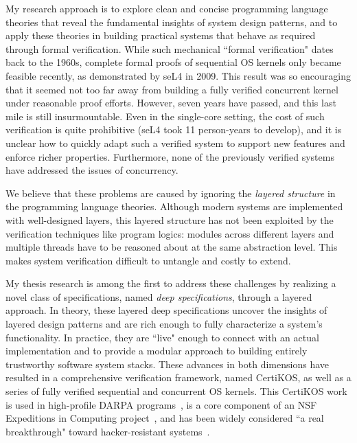 \documentclass[a4paper, 10pt]{article}
\begin{document}
\begin{small}
My research approach  is to explore clean and concise
programming language theories that 
reveal the fundamental insights of system design patterns,
and to apply these theories
in building practical systems that behave as required
through formal verification. 
While such mechanical ``formal verification" dates back to the 1960s, 
complete formal proofs of sequential OS kernels only became feasible recently, as demonstrated by seL4 in 2009. This result was so encouraging that it seemed not too far away from building a fully verified concurrent kernel under reasonable proof efforts. However, 
seven years have passed, and
this last mile is still insurmountable.
Even in the single-core setting, the cost of such verification is quite prohibitive
(seL4 took 11 person-years to develop), and
 it is unclear how to quickly adapt such a verified system to support new features and enforce richer properties. 
Furthermore, none of the previously verified systems have addressed the
issues of concurrency.

 
We believe that these problems
are caused by ignoring the \emph{layered structure} in the programming language theories.
Although modern systems are implemented with
well-designed layers, this layered structure has not been exploited by the verification techniques like program logics:  modules across different layers and multiple threads have to be reasoned about at 
the same abstraction level. This makes system verification
difficult to untangle
and costly to extend.

My thesis research is among the first to address these challenges
by realizing a novel class of specifications, named \emph{deep specifications}, through a layered approach.
In theory, these layered deep specifications uncover the 
insights of  layered design patterns
and are rich
enough to fully characterize a system's functionality. In practice, they are ``live" enough to  connect   with an actual  implementation and to provide a modular approach to building
entirely trustworthy
 software system stacks.
These advances in both dimensions have resulted in a comprehensive
verification framework, named CertiKOS, as well as
a series of fully verified sequential and concurrent OS kernels.
This CertiKOS work is used in high-profile DARPA programs~\cite{crash,hacms},
is a core component of an NSF Expeditions in Computing project~\cite{deepspec}, and has been widely considered
 ``a real breakthrough" toward hacker-resistant systems~\cite{news, times, dnews}.



\end{small}
\end{document}
